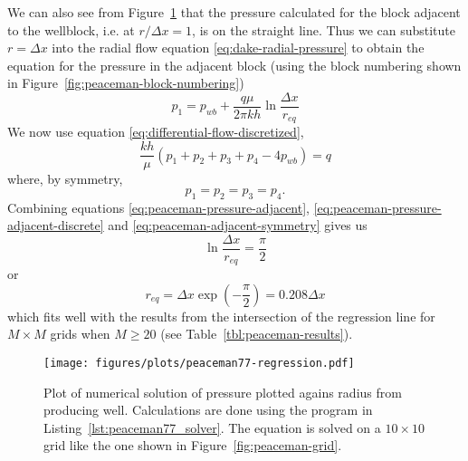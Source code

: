 We can also see from Figure~\ref{fig:peaceman77_pressure_vs_radius} that the pressure calculated for the block adjacent to the wellblock, i.e. at $r/\Delta x=1$, is on the straight line. Thus we can substitute $r=\Delta x$ into the radial flow equation \eqref{eq:dake-radial-pressure} to obtain the equation for the pressure in the adjacent block (using the block numbering shown in Figure~\ref{fig:peaceman-block-numbering})
\begin{equation}
    \label{eq:peaceman-pressure-adjacent}
    p_1 = p_{wb} + \frac{q\mu}{2\pi kh} \ln{\frac{\Delta x}{r_{eq}}}
\end{equation}
We now use equation \eqref{eq:differential-flow-discretized},
\begin{equation}
    \label{eq:peaceman-pressure-adjacent-discrete}
    \frac{kh}{\mu} \left( p_1 + p_2 + p_3 + p_4 -4p_{wb}  \right) = q
\end{equation}
where, by symmetry,
\begin{equation}
    \label{eq:peaceman-adjacent-symmetry}
    p_1=p_2=p_3=p_4.
\end{equation}
Combining equations \eqref{eq:peaceman-pressure-adjacent}, \eqref{eq:peaceman-pressure-adjacent-discrete} and \eqref{eq:peaceman-adjacent-symmetry} gives us
\begin{equation}
    \ln{\frac{\Delta x}{r_{eq}}} = \frac{\pi}{2}
\end{equation}
or
\begin{equation}
    r_{eq} = \Delta x \exp{\left( -\frac{\pi}{2} \right)} = 0.208 \Delta x
\end{equation}
which fits well with the results from the intersection of the regression line for $M\times M$ grids when $M\geq 20$ (see Table~\ref{tbl:peaceman-results}).

\begin{figure}[htbp]
    \centering
    \texttt{[image: figures/plots/peaceman77-regression.pdf]}
    \caption{Plot of numerical solution of pressure plotted agains radius from producing well. Calculations are done using the program in Listing~\ref{lst:peaceman77_solver}. The equation is solved on a $10\times 10$ grid like the one shown in Figure~\ref{fig:peaceman-grid}.}
    \label{fig:peaceman77_pressure_vs_radius}
\end{figure}



